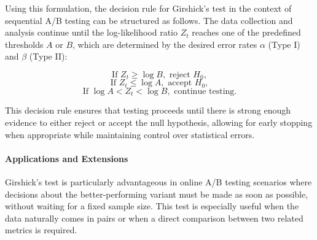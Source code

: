 \documentclass[magisterska, english]{pwr_wmat_praca_dyplomowa}
\theoremstyle{plain}
\numberwithin{theorem}{chapter}
\theoremstyle{definition}
\numberwithin{theorem}{chapter}
\begin{document}
Using this formulation, the decision rule for Girshick’s test in the context of sequential A/B testing can be structured as follows. The data collection and analysis continue until the log-likelihood ratio \(Z_t\) reaches one of the predefined thresholds \(A\) or \(B\), which are determined by the desired error rates \(\alpha\) (Type I) and \(\beta\) (Type II):

\[
\text{If } Z_t \geq \log B, \text{ reject } H_0,
\]
\[
\text{If } Z_t \leq \log A, \text{ accept } H_0,
\]
\[
\text{If } \log A < Z_t < \log B, \text{ continue testing}.
\]

This decision rule ensures that testing proceeds until there is strong enough evidence to either reject or accept the null hypothesis, allowing for early stopping when appropriate while maintaining control over statistical errors.

%
%
%
%
\paragraph{Applications and Extensions}

Girshick's test is particularly advantageous in online A/B testing scenarios where decisions about the better-performing variant must be made as soon as possible, without waiting for a fixed sample size. This test is especially useful when the data naturally comes in pairs or when a direct comparison between two related metrics is required.
\end{document}
